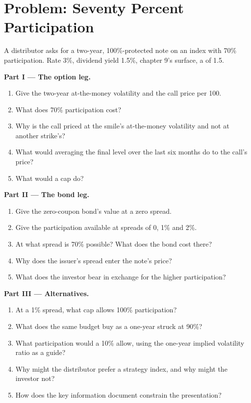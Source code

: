 \section{Problem: Seventy Percent Participation}

\begin{problem}\label{pb:dv:the-structured-products-business:1}
A distributor asks for a two-year, 100\%-protected note on an index with 70\% participation. Rate 3\%, dividend yield 1.5\%, chapter 9's
surface, a  of 1.5.

\medskip\noindent\textbf{Part I --- The option leg.}
\begin{enumerate}
\item Give the two-year at-the-money volatility and the call price per 100.
\item What does 70\% participation cost?
\item Why is the call priced at the smile's at-the-money volatility and not at another strike's?
\item What would averaging the final level over the last six months do to the call's price?
\item What would a cap do?
\end{enumerate}

\medskip\noindent\textbf{Part II --- The bond leg.}
\begin{enumerate}[resume]
\item Give the zero-coupon bond's value at a zero spread.
\item Give the participation available at spreads of 0, 1\% and 2\%.
\item At what spread is 70\% possible? What does the bond cost there?
\item Why does the issuer's spread enter the note's price?
\item What does the investor bear in exchange for the higher participation?
\end{enumerate}

\medskip\noindent\textbf{Part III --- Alternatives.}
\begin{enumerate}[resume]
\item At a 1\% spread, what cap allows 100\% participation?
\item What does the same budget buy as a one-year  struck at 90\%?
\item What participation would a 10\%  allow, using the one-year implied volatility ratio as a guide?
\item Why might the distributor prefer a strategy index, and why might the investor not?
\item How does the key information document constrain the presentation?
\end{enumerate}


\end{problem}
